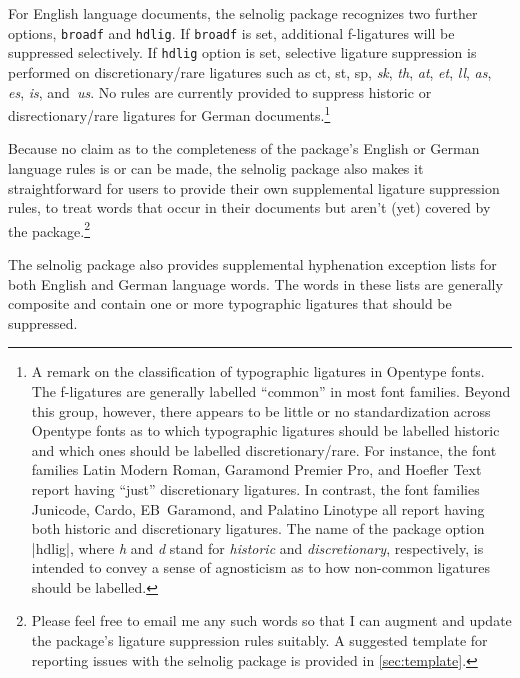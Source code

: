 \documentclass[11pt]{article}
\newcommand{\pkg}[1]{\textsf{#1}}
\newcommand{\opt}[1]{\texttt{#1}}
\begin{document}

For English language documents, the \pkg{selnolig} package recognizes two further options, \opt{broadf} and \opt{hdlig}. If \opt{broadf} is set, additional f-ligatures will be suppressed selectively. If \opt{hdlig} option is set, selective ligature suppression is performed on discretionary\slash rare ligatures such as ct, st, sp, {\ebg\emph{sk}}, \emph{th}, \emph{at}, \emph{et}, \emph{ll}, \emph{as}, \emph{\ebg es}, \emph{is}, and~\emph{us}. No rules are currently provided to suppress historic or disrectionary\slash rare ligatures for German documents.\footnote{A remark on the classification of typographic ligatures in Opentype fonts.  The f-ligatures are generally labelled \enquote{common} in most font families. Beyond this group, however, there appears to be little or no standardization across Opentype fonts as to which typographic ligatures should be labelled historic and which ones should be labelled discretionary\slash rare. For instance, the font families Latin Modern Roman, Garamond Premier Pro, and Hoefler Text report having \enquote{just} discretionary ligatures. In contrast, the font families Junicode, Cardo, EB~Garamond, and Palatino Linotype all report having both historic and discretionary ligatures. The name of the package option |hdlig|, where \emph{h} and \emph{d} stand for \emph{historic} and \emph{discretionary}, respectively, is intended to convey a sense of agnosticism as to how non-common ligatures should be labelled.}

Because no claim as to the completeness of the package's English or German language rules is or can be made, the \pkg{selnolig} package also makes it straightforward for users to provide their own supplemental ligature suppression rules, to treat words that occur in their documents but aren't (yet) covered by the package.\footnote{Please feel free to email me any such words so that I can augment and update the package's ligature suppression rules suitably. A suggested template for reporting issues with the \pkg{selnolig} package is provided in \cref{sec:template}.}

The \pkg{selnolig} package also provides supplemental hyphenation exception lists for both English and German language words. The words in these lists are generally composite and contain one or more typographic ligatures that should be suppressed.
\end{document}
